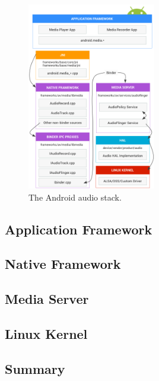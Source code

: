 \begin{figure}[!bht]
    \centering
    \includegraphics[width=0.5\textwidth]{img/sound_stack.png}
    \caption{The Android audio stack\cite{sound_stack}.}
    \label{fig:sound_stack}
\end{figure}

\subsection{Application Framework}
\subsection{Native Framework}
\subsection{Media Server}
\subsection{Linux Kernel}
\subsection{Summary}


